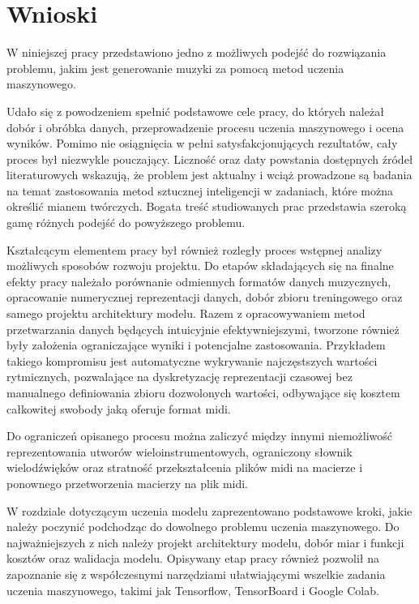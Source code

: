 \chapter{Wnioski}\label{chap:concl}
{
    W\,\,niniejszej pracy przedstawiono jedno z\,\,możliwych podejść do rozwiązania problemu,
    jakim jest generowanie muzyki za pomocą metod uczenia maszynowego. 

    Udało się z powodzeniem spełnić podstawowe cele pracy, do których należał dobór i obróbka danych, 
    przeprowadzenie procesu uczenia maszynowego i ocena wyników. Pomimo nie osiągnięcia w\,\,pełni satysfakcjonujących rezultatów, cały proces był niezwykle pouczający. 
    Liczność oraz daty powstania dostępnych źródeł literaturowych wskazują, że problem jest aktualny 
    i\,\,wciąż prowadzone są badania na temat zastosowania metod sztucznej inteligencji w\,\,zadaniach, 
    które można określić mianem twórczych. Bogata treść studiowanych prac przedstawia szeroką gamę 
    różnych podejść do powyższego problemu.

    Kształcącym elementem pracy był również rozległy proces wstępnej analizy możliwych sposobów
    rozwoju projektu. Do etapów składających się na finalne efekty pracy należało porównanie odmiennych 
    formatów danych muzycznych, opracowanie numerycznej reprezentacji danych, dobór zbioru treningowego
    oraz samego projektu architektury modelu. 
    Razem z\,\,opracowywaniem metod przetwarzania danych będących intuicyjnie efektywniejszymi, tworzone również były założenia
    ograniczające wyniki i\,\,potencjalne zastosowania. Przykładem takiego kompromisu jest automatyczne wykrywanie
    najczęstszych wartości rytmicznych, pozwalające na dyskretyzację reprezentacji czasowej bez
    manualnego definiowania zbioru dozwolonych wartości, odbywające się kosztem całkowitej swobody jaką oferuje format midi.
    
    Do ograniczeń opisanego procesu można zaliczyć między innymi niemożliwość reprezentowania utworów wieloinstrumentowych, 
    ograniczony słownik wielodźwięków oraz stratność przekształcenia plików midi na macierze i\,\,ponownego przetworzenia
    macierzy na plik midi.

    W\,\,rozdziale dotyczącym uczenia modelu zaprezentowano podstawowe kroki, jakie należy poczynić podchodząc do
    dowolnego problemu uczenia maszynowego. Do najważniejszych z\,\,nich należy projekt architektury modelu,
    dobór miar i\,\,funkcji kosztów oraz walidacja modelu. Opisywany etap pracy również pozwolił na zapoznanie 
    się z\,\,współczesnymi narzędziami ułatwiającymi wszelkie zadania uczenia maszynowego, takimi jak Tensorflow, 
    TensorBoard i\,\,Google Colab. 

}
